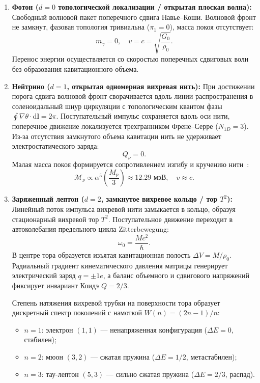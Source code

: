 \documentclass[11pt,a4paper]{article}
\theoremstyle{definition}
\theoremstyle{remark}
\begin{document}
\begin{enumerate}
\item \textbf{Фотон ($d = 0$ топологической локализации / открытая плоская волна):}
Свободный волновой пакет поперечного сдвига Навье--Коши. Волновой фронт не замкнут, фазовая топология тривиальна ($\pi_1 = 0$), масса покоя отсутствует:
\begin{equation}
	m_\gamma = 0, \quad v = c = \sqrt{\frac{G_0}{\rho_0}}.
	\label{eq:photon_mass_zero}
\end{equation}
Перенос энергии осуществляется со скоростью поперечных сдвиговых волн без образования кавитационного объема.
		
\item \textbf{Нейтрино ($d = 1$, открытая одномерная вихревая нить):}
При достижении порога сдвига волновой фронт сворачивается вдоль линии распространения в соленоидальный шнур циркуляции с топологическим квантом фазы $\oint \nabla\theta \cdot \mathrm{d}\mathbf{l} = 2\pi$. Поступательный импульс сохраняется вдоль оси нити, поперечное движение локализуется трехгранником Френе--Серре ($N_{1D} = 3$). Из-за отсутствия замкнутого объема кавитации нить не удерживает электростатического заряда:
\begin{equation}
	Q_\nu = 0.
	\label{eq:neutrino_charge_zero}
\end{equation}
Малая масса покоя формируется сопротивлением изгибу и кручению нити~\cite{Mindlin1964}:
\begin{equation}
	\mathcal{M}_\nu \propto \alpha^5 \left(\frac{M_p}{3}\right) \approx 12.29\text{ мэВ}, \quad v \approx c.
	\label{eq:neutrino_mass_scale_concept}
\end{equation}
		
\item \textbf{Заряженный лептон ($d = 2$, замкнутое вихревое кольцо / тор $T^2$):}
Линейный поток импульса вихревой нити замыкается в кольцо, образуя стационарный вихревой тор $T^2$. Поступательное движение переходит в автоколебания предельного цикла Zitterbewegung:
\begin{equation}
	\omega_0 = \frac{M c^2}{\hbar}.
	\label{eq:zitterbewegung_freq_def}
\end{equation}
В центре тора образуется изъятая кавитационная полость $\Delta V = M / \rho_0$. Радиальный градиент кинематического давления матрицы генерирует электрический заряд $q = \pm 1e$, а баланс объемного и сдвигового напряжений фиксирует инвариант Коидэ $Q = 2/3$.
		
Степень натяжения вихревой трубки на поверхности тора образует дискретный спектр поколений с намоткой $W(n) = (2n-1)/n$:
\begin{itemize}
	\item $n=1$: электрон $(1,1)$ — ненапряженная конфигурация ($\Delta E = 0$, стабилен);
	\item $n=2$: мюон $(3,2)$ — сжатая пружина ($\Delta E = 1/2$, метастабилен);
	\item $n=3$: тау-лептон $(5,3)$ — сильно сжатая пружина ($\Delta E = 2/3$, распад).
\end{itemize}
		

\end{enumerate}
\end{document}

